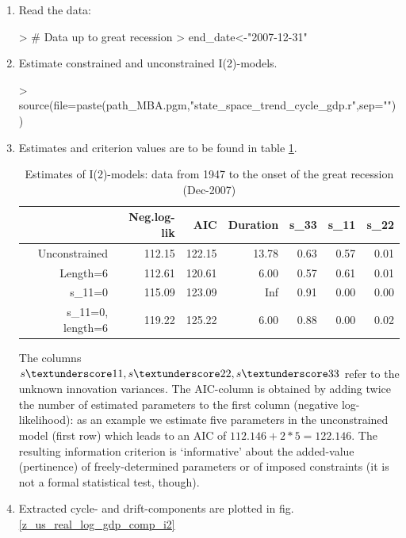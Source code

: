 \documentclass[a4paper]{book}
\begin{document}
\begin{enumerate}
\item Read the data:
\begin{Schunk}
\begin{Sinput}
> # Data up to great recession
> end_date<-"2007-12-31"
\end{Sinput}
\end{Schunk}
\item Estimate constrained and unconstrained I(2)-models.  
\begin{Schunk}
\begin{Sinput}
> source(file=paste(path_MBA.pgm,"state_space_trend_cycle_gdp.r",sep=""))
\end{Sinput}
\end{Schunk}

\item Estimates and criterion values are to be found in table \ref{z_ss_uc0_t_gr_i2}.
\begin{table}[ht]
\centering
\begin{tabular}{rrrrrrr}
  \hline
 & Neg.log-lik & AIC & Duration & s\_33 & s\_11 & s\_22 \\ 
  \hline
Unconstrained & 112.15 & 122.15 & 13.78 & 0.63 & 0.57 & 0.01 \\ 
  Length=6 & 112.61 & 120.61 & 6.00 & 0.57 & 0.61 & 0.01 \\ 
  s\_11=0 & 115.09 & 123.09 & Inf & 0.91 & 0.00 & 0.00 \\ 
  s\_11=0, length=6 & 119.22 & 125.22 & 6.00 & 0.88 & 0.00 & 0.02 \\ 
   \hline
\end{tabular}
\caption{Estimates of I(2)-models: data from 1947 to the onset of the great recession (Dec-2007)} 
\label{z_ss_uc0_t_gr_i2}
\end{table}The columns $s \textunderscore 11, s \textunderscore 22, s \textunderscore 33$ refer to the unknown innovation variances. The AIC-column is obtained by adding twice the number of estimated parameters to the first column (negative log-likelihood): as an example we estimate five parameters in the unconstrained model (first row) which leads to an AIC of $112.146+2*5=122.146$. The resulting information criterion is `informative' about the added-value (pertinence) of freely-determined parameters or of imposed constraints (it is not a formal statistical test, though).
\item Extracted cycle- and drift-components are plotted in fig.\ref{z_us_real_log_gdp_comp_i2}


\end{enumerate}
\end{document}
